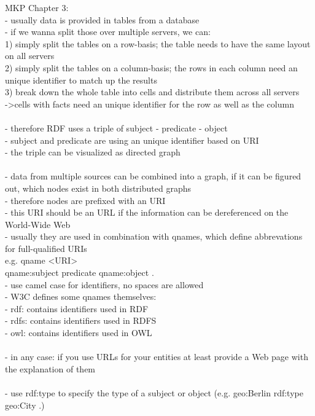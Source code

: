 MKP Chapter 3: \\
- usually data is provided in tables from a database \\
- if we wanna split those over multiple servers, we can: \\
  1) simply split the tables on a row-basis; the table needs to have the same layout on all servers \\
	2) simply split the tables on a column-basis; the rows in each column need an unique identifier to match up the results \\
	3) break down the whole table into cells and distribute them across all servers \\
	 -\textgreater cells with facts need an unique identifier for the row as well as the column \\
\\
- therefore RDF uses a triple of subject - predicate - object \\
- subject and predicate are using an unique identifier based on URI \\
- the triple can be visualized as directed graph \\
\\
- data from multiple sources can be combined into a graph, if it can be figured out, which nodes exist in both distributed graphs \\
- therefore nodes are prefixed with an URI \\
- this URI should be an URL if the information can be dereferenced on the World-Wide Web \\
- usually they are used in combination with qnames, which define abbrevations for full-qualified URIs \\
   e.g. qname \textless URI\textgreater \\
	      qname:subject predicate qname:object . \\
- use camel case for identifiers, no spaces are allowed \\
- W3C defines some qnames themselves: \\
   - rdf: contains identifiers used in RDF \\
	 - rdfs: contains identifiers used in RDFS \\
	 - owl: contains identifiers used in OWL \\
\\
- in any case: if you use URLs for your entities at least provide a Web page with the explanation of them \\
\\
- use rdf:type to specify the type of a subject or object (e.g. geo:Berlin rdf:type geo:City .) \\
